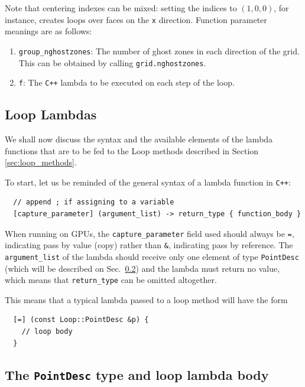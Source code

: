 Note that centering indexes can be mixed: setting the indices to $(1,0,0)$, for instance, creates loops over faces on the \texttt{x} direction. Function parameter meanings are as follows:

\begin{enumerate}
  \item \texttt{group\_nghostzones}: The number of ghost zones in each direction of the grid. This can be obtained by calling \texttt{grid.nghostzones}.
  \item \texttt{f}: The \texttt{C++} lambda to be executed on each step of the loop.
\end{enumerate}

\subsection{Loop Lambdas}

We shall now discuss the syntax and the available elements of the lambda functions that are to be fed to the Loop methods described in Section \ref{sec:loop_methods}.

To start, let us be reminded of the general syntax of a lambda function in \texttt{C++}:

\begin{lstlisting}
  // append ; if assigning to a variable
  [capture_parameter] (argument_list) -> return_type { function_body }
\end{lstlisting}

When running on GPUs, the \texttt{capture\_parameter} field used should always be \texttt{=}, indicating pass by value (copy) rather than \texttt{\&}, indicating pass by reference. The \texttt{argument\_list} of the lambda should receive only one element of type \texttt{PointDesc} (which will be described on Sec.~\ref{sec:point_des}) and the lambda must return no value, which means that \texttt{return\_type} can be omitted altogether.

This means that a typical lambda passed to a loop method will have the form
%
\begin{lstlisting}
  [=] (const Loop::PointDesc &p) {
    // loop body
  }
\end{lstlisting}

\subsection{The \texttt{PointDesc} type and loop lambda body}
\label{sec:point_des}

